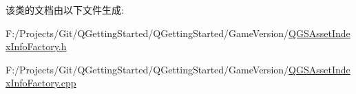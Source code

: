 该类的文档由以下文件生成\+:\begin{DoxyCompactItemize}
\item 
F\+:/\+Projects/\+Git/\+Q\+Getting\+Started/\+Q\+Getting\+Started/\+Game\+Version/\mbox{\hyperlink{_q_g_s_asset_index_info_factory_8h}{Q\+G\+S\+Asset\+Index\+Info\+Factory.\+h}}\item 
F\+:/\+Projects/\+Git/\+Q\+Getting\+Started/\+Q\+Getting\+Started/\+Game\+Version/\mbox{\hyperlink{_q_g_s_asset_index_info_factory_8cpp}{Q\+G\+S\+Asset\+Index\+Info\+Factory.\+cpp}}\end{DoxyCompactItemize}
